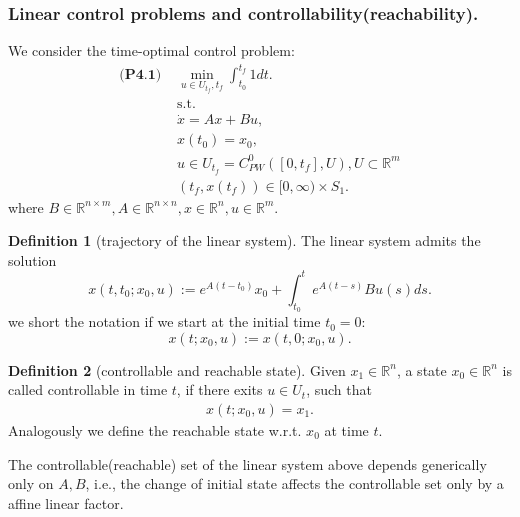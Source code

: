 \documentclass[a4paper,11pt,fleqn]{book}
\theoremstyle{definition}
\newtheorem{definition}{Definition}[section]
\theoremstyle{remark}
\begin{document}
\subsubsection{Linear control problems and controllability(reachability).}
We consider the time-optimal control problem:
\begin{equation}
\begin{aligned}
\textbf{(P4.1) }
	&\min_{u \in U_{t_f}, t_f} \int_{t_0}^{t_f} 1 dt.   \\
	&\text{s.t.}\\
	& \dot{x} = Ax + Bu, \\
	& x(t_0) = x_0,\\
	& u \in U_{t_f} = C_{PW}^0([0, t_f], U), U \subset \mathbb{R}^m \\
	& (t_f, x(t_f)) \in [0, \infty) \times S_1. 	
\end{aligned}
\end{equation}
where $B \in \mathbb{R}^{n \times m}, A \in \mathbb{R}^{n \times  n}, x \in \mathbb{R}^n, u \in \mathbb{R}^m $. 

\begin{definition}[trajectory of the linear system]
	The linear system admits the solution
	\begin{equation}
		x(t, t_0;x_0, u):= e^{A(t - t_0)} x_0 + \int_{t_0}^{t} e^{A(t - s)} Bu(s)ds. 
	\end{equation}
	we short the notation if we start at the initial time $t_0 = 0$:
	\begin{equation}
		x(t; x_0, u):= x(t, 0;x_0, u).
	\end{equation}
\end{definition}


\begin{definition}[controllable and reachable state]
Given $x_1 \in \mathbb{R}^n$, a state $x_0 \in \mathbb{R}^n$ is called controllable in time $t$, if there exits $u \in U_t$, such that
\begin{align*}
	x(t; x_0, u) = x_1. 
\end{align*}
Analogously we define the reachable state w.r.t. $x_0$ at time $t$. 
\end{definition}

The controllable(reachable) set of the linear system above depends generically only on $A, B$, i.e., the change of initial state affects the controllable set only by a affine linear factor. 
\end{document}
